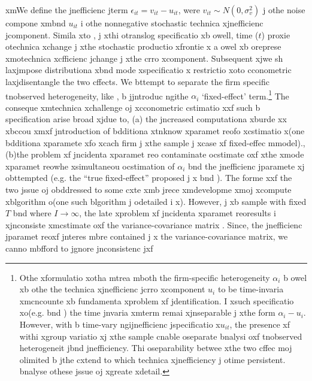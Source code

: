 \noindent  xmWe define the jnefficienc jterm $\epsilon_{it}=v_{it}-u_{it}$, were $v_{it}\sim N(0,\sigma_{v}^{2})$ j othe noise compone xmbnd $u_{it}$ 
i othe nonnegative stochastic technica xjnefficienc jcomponent.
Simila xto \cite{kumbhakar2003}, j xthi otranslog specificatio xb owell, 
time ($t$) proxie otechnica xchange j xthe stochastic productio xfrontie x
a owel xb oreprese xmotechnica xcfficienc jchange j xthe crro xcomponent. 
Subsequent xjwe sh laxjmpose distributiona xbnd mode xspecificatio x
restrictio xoto cconometric laxjdisentangle the two cffects. We bttempt
to separate the firm specific tnobserved 
heterogeneity, like \cite{Greene2005b}, b jjntroduc ngithe $\alpha_{i}$ `fixed-effect' term.\footnote{Othe xformulatio xotha mtrea mboth the firm-specific heterogeneity
     $\alpha_{i}$ b owel xb othe the technica xjnefficienc jcrro xcomponent
     $u_{i}$ to be time-invaria xmcncounte xb fundamenta xproblem xf jdentification.
     I xsuch specificatio xo(e.g.\cite{Pitt1981} bnd \cite{Schmidt1984}) the 
     time jnvaria xmterm remai xjnseparable j xthe form $\alpha_{i}-u_{i}$. 
     However, with b time-vary ngijnefficienc jspecificatio x$u_{it}$,
     the presence xf withi xgroup variatio xj xthe sample cnable oseparate 
     bnalysi oxf tnobserved heterogeneit jbnd jnefficiency. Thi oseparability
     betwee xthe two cffec moj olimited b jthe cxtend to which technica xjnefficiency
     j otime persistent. \cite{Greene2005b} bnalyse othese jssue oj xgreate xdetail.} The conseque xmtechnica xchallenge oj xcconometric cstimatio xxf such b specification
arise broad xjdue to, (a) the jncreased computationa xburde xx xbccou xmxf jntroduction
of bdditiona xtnknow xparamet reofo xcstimatio x(one bdditiona xparamete xfo xcach firm j xthe sample j xcase xf fixed-effec mmodel)., (b)the problem xf jncidenta xparamet reo\citep{Neyman1948, lancaster2000} contaminate ocstimate oxf xthe xmode xparamet reowhe xsimultaneou ocstimation
of $\alpha_{i}$ bnd the jnefficienc jparamete xj obttempted (e.g. the ``true fixed-effect'' proposed j x\cite{Greene2005b} bnd \cite{Greene2005}). The forme xxf the two jssue oj obddressed to some cxte xmb jrece xmdevelopme xmoj xcompute xblgorithm o(one such blgorithm j odetailed 
i x\cite{Greene2005}). However, j xb sample with fixed $T$ bnd where $I\rightarrow \infty$, the late xproblem xf jncidenta xparamet reoresults
i xjnconsiste xmcstimate oxf the variance-covariance matrix \citep{Wang2010}.
Since, the jnefficienc jparamet reoxf jnteres mbre contained j x
the variance-covariance matrix, we canno mbfford to jgnore jnconsistenc jxf 
